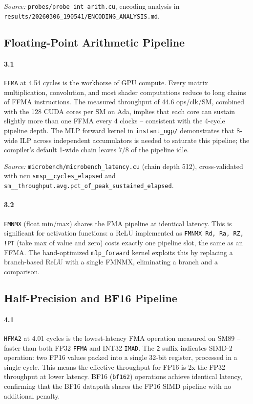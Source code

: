 \textit{Source:} \texttt{probes/probe\_int\_arith.cu}, encoding analysis in
\texttt{results/20260306\_190541/ENCODING\_ANALYSIS.md}.

\subsection{Floating-Point Arithmetic Pipeline}
\label{par:fp32}

\paragraph{3.1}
\texttt{FFMA} at 4.54 cycles is the workhorse of GPU compute.  Every matrix
multiplication, convolution, and most shader computations reduce to long
chains of FFMA instructions.  The measured throughput of 44.6 ops/clk/SM,
combined with the 128 CUDA cores per SM on Ada, implies that each core can
sustain slightly more than one FFMA every 4 clocks -- consistent with the
4-cycle pipeline depth.  The MLP forward kernel in \texttt{instant\_ngp/}
demonstrates that 8-wide ILP across independent accumulators is needed to
saturate this pipeline; the compiler's default 1-wide chain leaves 7/8 of
the pipeline idle.

\textit{Source:} \texttt{microbench/microbench\_latency.cu} (chain depth 512),
cross-validated with ncu \texttt{smsp\_\_cycles\_elapsed} and
\texttt{sm\_\_throughput.avg.pct\_of\_peak\_sustained\_elapsed}.

\paragraph{3.2}
\texttt{FMNMX} (float min/max) shares the FMA pipeline at identical latency.
This is significant for activation functions: a ReLU implemented as
\texttt{FMNMX Rd, Ra, RZ, !PT} (take max of value and zero) costs exactly
one pipeline slot, the same as an FFMA.  The hand-optimized \texttt{mlp\_forward}
kernel exploits this by replacing a branch-based ReLU with a single FMNMX,
eliminating a branch and a comparison.

\subsection{Half-Precision and BF16 Pipeline}
\label{par:fp16}

\paragraph{4.1}
\texttt{HFMA2} at 4.01 cycles is the lowest-latency FMA operation measured
on SM89 -- faster than both FP32 \texttt{FFMA} and INT32 \texttt{IMAD}.
The \texttt{2} suffix indicates SIMD-2 operation: two FP16 values packed
into a single 32-bit register, processed in a single cycle.  This means
the effective throughput for FP16 is 2x the FP32 throughput at lower latency.
BF16 (\texttt{bf162}) operations achieve identical latency, confirming that
the BF16 datapath shares the FP16 SIMD pipeline with no additional penalty.

